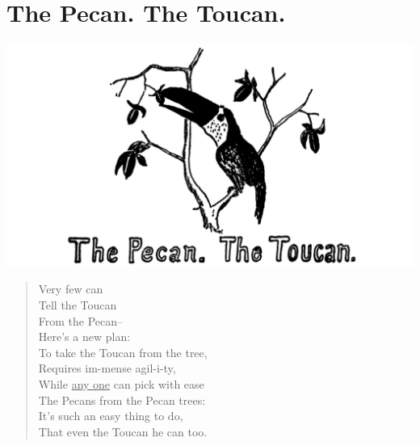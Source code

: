 \documentclass[letterpaper, 10pt, openany]{memoir}
\begin{document}
\chapter{The Pecan. The Toucan.}
\includegraphics[width=1\textwidth]{f-p17.png}
\vspace{\onelineskip}
\begin{verse}\huge
Very few can\\
Tell the Toucan\\
From the Pecan--\\
Here's a new plan:\\
To take the Toucan from the tree,\\
Requires im-mense agil-i-ty,\\
While \underline{any one} can pick with ease\\
The Pecans from the Pecan trees:\\
It's such an easy thing to do,\\
That even the Toucan he can too.\\
\end{verse}
\end{document}
